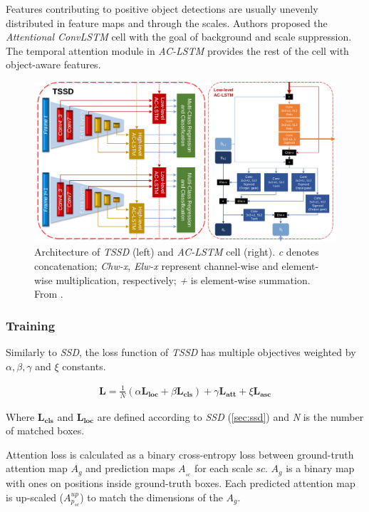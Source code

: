 Features contributing to positive object detections are usually unevenly distributed in feature maps and through the scales. Authors proposed the \textit{Attentional ConvLSTM} cell with the goal of background and scale suppression.  The temporal attention module in \textit{AC-LSTM} provides the rest of the cell with object-aware features. 

\begin{figure}
    \centering
    \includegraphics[width=\textwidth]{img/tssd}
    \caption[TSSD architecture and AC-LSTM cell]%
    {Architecture of \textit{TSSD} (left) and \textit{AC-LSTM} cell (right). \textit{c} denotes concatenation; \textit{Chw-x}, \textit{Elw-x} represent channel-wise and element-wise multiplication, respectively; \textit{+} is element-wise summation. From \cite[fig.~2,~3]{bib:tssd}.}
    \label{fig:tssd}
\end{figure}


\subsubsection{Training}
Similarly to \textit{SSD}, the loss function of \textit{TSSD} has multiple objectives weighted by $\alpha, \beta, \gamma$ and $\xi$ constants.

\begin{align*}
\mathbf{L} = \frac{1}{N}(\alpha\mathbf{L_{\text{loc}}} + \beta\mathbf{L_{\text{cls}}}) + \gamma\mathbf{L_{\text{att}}} + \xi\mathbf{L_{\text{asc}}}
\end{align*}


Where $\mathbf{L_{\text{cls}}}$ and $\mathbf{L_{\text{loc}}}$ are defined according to \textit{SSD} (\cref{sec:ssd}) and \textit{N} is the number of matched boxes.

Attention loss is calculated as a binary cross-entropy loss between ground-truth attention map $A_g$ and prediction maps $A_{_{sc}}$ for each scale $sc$. $A_g$ is a binary map with ones on positions inside ground-truth boxes. Each predicted attention map is up-scaled ($A^{up}_{p_{sc}}$) to match the dimensions of the $A_g$.

